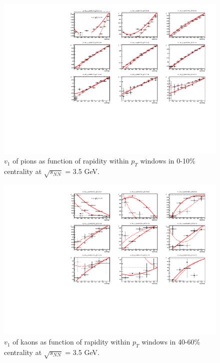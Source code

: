 \begin{figure}[hbt!]
\centering
\includegraphics[width=0.85\linewidth]{figures/chapter03/3p5gev_pionp_v1VSy_9pT_cent2.pdf}
\caption{$v_1$ of pions as function of rapidity within $p_T$ windows in 0-10\% centrality at $\sqrt{s_{NN}}$ = 3.5 GeV.}
\label{fig:3p5gev_pion_v1y_pt_cent2}
\end{figure}


\begin{figure}[hbt!]
\centering
\includegraphics[width=0.85\linewidth]{figures/chapter03/3p5gev_kaonp_v1VSy_9pT_cent0.pdf}
\caption{$v_1$ of kaons as function of rapidity within $p_T$ windows in 40-60\% centrality at $\sqrt{s_{NN}}$ = 3.5 GeV.}
\label{fig:3p5gev_kaon_v1y_pt_cent0}
\end{figure}

